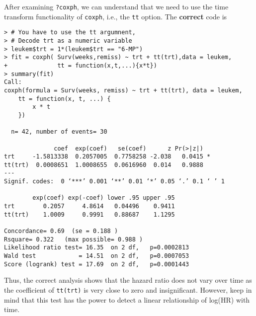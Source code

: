 \begin{enumerate}[(a)]
\begin{enumerate}[(i)]
After examining \verb|?coxph|, we can understand that we need to use the time transform functionality of \verb|coxph|, i.e., the \verb|tt| option. The \textbf{correct} code is
\begin{spacing}{1.2}
\begin{footnotesize}
\begin{verbatim}
> # You have to use the tt argumnent, 
> # Decode trt as a numeric variable
> leukem$trt = 1*(leukem$trt == "6-MP")
> fit = coxph( Surv(weeks,remiss) ~ trt + tt(trt),data = leukem, 
+              tt = function(x,t,...){x*t})
> summary(fit)
Call:
coxph(formula = Surv(weeks, remiss) ~ trt + tt(trt), data = leukem, 
    tt = function(x, t, ...) {
        x * t
    })

  n= 42, number of events= 30 

              coef  exp(coef)   se(coef)      z Pr(>|z|)  
trt     -1.5813338  0.2057005  0.7758258 -2.038   0.0415 *
tt(trt)  0.0008651  1.0008655  0.0616960  0.014   0.9888  
---
Signif. codes:  0 ‘***’ 0.001 ‘**’ 0.01 ‘*’ 0.05 ‘.’ 0.1 ‘ ’ 1

        exp(coef) exp(-coef) lower .95 upper .95
trt        0.2057     4.8614   0.04496    0.9411
tt(trt)    1.0009     0.9991   0.88687    1.1295

Concordance= 0.69  (se = 0.188 )
Rsquare= 0.322   (max possible= 0.988 )
Likelihood ratio test= 16.35  on 2 df,   p=0.0002813
Wald test            = 14.51  on 2 df,   p=0.0007053
Score (logrank) test = 17.69  on 2 df,   p=0.0001443
\end{verbatim}
\end{footnotesize}
\end{spacing}
Thus, the correct analysis shows that the hazard ratio does not vary over time as the coefficient of \verb|tt(trt)| is very close to zero and insignificant. However, keep in mind that this test has the power to detect a linear relationship of log(HR) with time. 
 
\end{enumerate}
\end{enumerate}

 